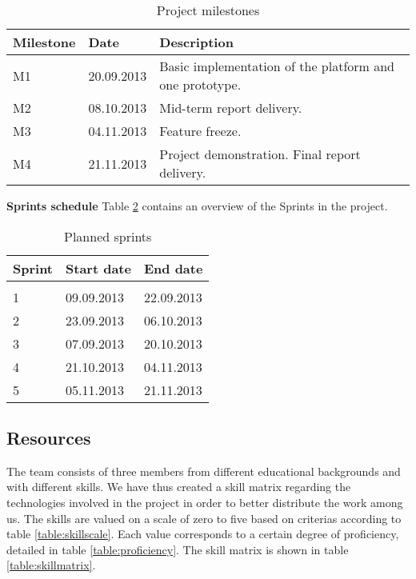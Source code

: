 \begin{table}[h]
\begin{center}
\begin{tabular}{ | l | l | l | }
  \hline
  Milestone & Date & Description \\
  \hline\noalign{\smallskip}\noalign{\smallskip}\hline
  M1 & 20.09.2013 & Basic implementation of the platform and one prototype. \\ 
  M2 & 08.10.2013 & Mid-term report delivery. \\
  M3 & 04.11.2013 & Feature freeze. \\
  M4 & 21.11.2013 & Project demonstration. Final report delivery. \\
  \hline
\end{tabular}
\end{center}
\caption{Project milestones}
\label{table:milestones}
\end{table}

\textbf{Sprints schedule} \newline
Table \ref{table:sprints} contains an overview of the Sprints in the project.

\begin{table}[h]
\begin{center}
\begin{tabular}{ | l | l | l | }
  \hline
  Sprint & Start date & End date \\
  \hline\noalign{\smallskip}\noalign{\smallskip}\hline
  0 &  &  \\ 
  1 & 09.09.2013 & 22.09.2013 \\
  2 & 23.09.2013 & 06.10.2013 \\
  3 & 07.09.2013 & 20.10.2013 \\
  4 & 21.10.2013 & 04.11.2013 \\
  5 & 05.11.2013 & 21.11.2013 \\
  \hline
\end{tabular}
\end{center}
\caption{Planned sprints}
\label{table:sprints}
\end{table}


\subsection{Resources}
The team consists of three members from different educational backgrounds and with different skills.
We have thus created a skill matrix regarding the technologies involved in the project in order to better distribute the work among us.
The skills are valued on a scale of zero to five based on criterias according to table \ref{table:skillscale}.
Each value corresponds to a certain degree of proficiency, detailed in table \ref{table:proficiency}.
The skill matrix is shown in table \ref{table:skillmatrix}.

